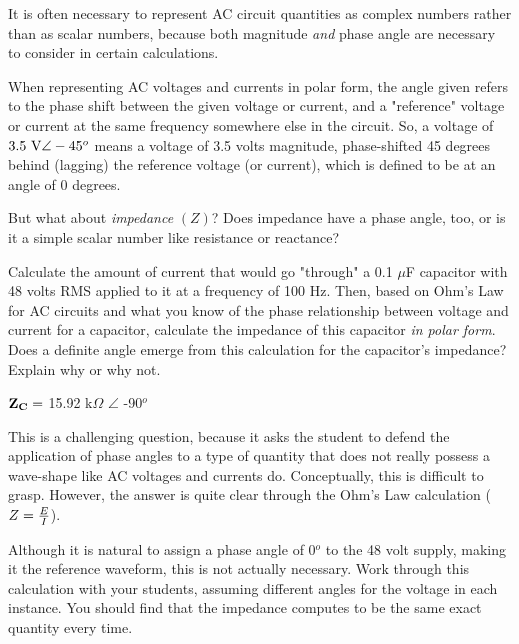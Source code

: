 

It is often necessary to represent AC circuit quantities as complex numbers rather than as scalar numbers, because both magnitude {\it and} phase angle are necessary to consider in certain calculations.

When representing AC voltages and currents in polar form, the angle given refers to the phase shift between the given voltage or current, and a "reference" voltage or current at the same frequency somewhere else in the circuit.  So, a voltage of $3.5 \hbox{ V} \angle -45^o$ means a voltage of 3.5 volts magnitude, phase-shifted 45 degrees behind (lagging) the reference voltage (or current), which is defined to be at an angle of 0 degrees.

But what about {\it impedance} $(Z)$?  Does impedance have a phase angle, too, or is it a simple scalar number like resistance or reactance?  

\vskip 10pt

Calculate the amount of current that would go "through" a 0.1 $\mu$F capacitor with 48 volts RMS applied to it at a frequency of 100 Hz.  Then, based on Ohm's Law for AC circuits and what you know of the phase relationship between voltage and current for a capacitor, calculate the impedance of this capacitor {\it in polar form}.  Does a definite angle emerge from this calculation for the capacitor's impedance?  Explain why or why not.







${\bf Z_C} =$ 15.92 k$\Omega$ $\angle$ -90$^{o}$







This is a challenging question, because it asks the student to defend the application of phase angles to a type of quantity that does not really possess a wave-shape like AC voltages and currents do.  Conceptually, this is difficult to grasp.  However, the answer is quite clear through the Ohm's Law calculation ($Z = {E \over I}$).

Although it is natural to assign a phase angle of 0$^{o}$ to the 48 volt supply, making it the reference waveform, this is not actually necessary.  Work through this calculation with your students, assuming different angles for the voltage in each instance.  You should find that the impedance computes to be the same exact quantity every time.




